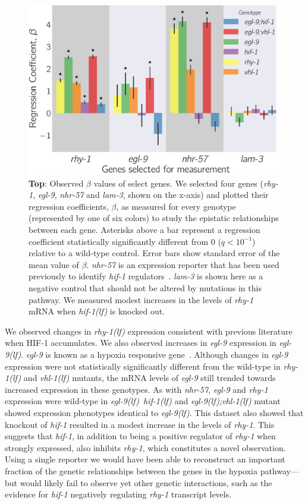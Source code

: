 \documentclass[10pt, onecolumn]{article}
\newcommand{\qval}[1]{$q<10^{-#1}$}
\newcommand{\gene}[1]{\emph{#1}}
\newcommand{\nhr}{\emph{\mbox{nhr-57}}}
\newcommand{\lam}{\emph{\mbox{lam-3}}}
\newcommand{\egl}{\emph{\mbox{egl-9}(lf)}}
\newcommand{\rhy}{\emph{\mbox{rhy-1}(lf)}}
\newcommand{\vhl}{\emph{\mbox{vhl-1}(lf)}}
\newcommand{\eglvhl}{\emph{\mbox{egl-9(lf);vhl-1(lf)}}}
\newcommand{\eglhif}{\emph{\mbox{egl-9(lf)}~\mbox{hif-1(lf)}}}
\newcommand{\hif}{\emph{\mbox{hif-1(lf)}}}
\newcommand{\hifp}{HIF-1}
\begin{document}
\begin{figure}[tbhp]
\centering
\includegraphics[width=.5\linewidth]{../figs/qpcr.pdf}
\caption{
\textbf{Top}: Observed $\beta$ values of select genes. We selected
four genes (\gene{rhy-1}, \gene{egl-9}, \nhr{} and \lam{}, shown on the x-axis)
and plotted their regression coefficients, $\beta$, as measured for every
genotype (represented by one of six colors) to study the epistatic relationships
between each gene. Asterisks above a bar represent a regression coefficient
statistically significantly different from 0 (\qval{1}) relative to a wild-type
control. Error bars show standard error of the mean
value of $\beta$. \nhr{} is an expression reporter that has been used previously
to identify \gene{hif-1} regulators~\cite{Shen2006,Shao2009}. \lam{} is shown here
as a negative control that should not be altered by mutations in this pathway.
We measured modest increases in the levels of \gene{rhy-1} mRNA when \hif{} is
knocked out.
}
\label{fig:qpcr}
\end{figure}

We observed changes in \rhy{} expression consistent with previous
literature~\cite{Shen2006} when \hifp{} accumulates.
We also observed increases in \gene{egl-9} expression in \egl{}.
\gene{egl-9} is known as a hypoxia responsive gene~\cite{Powell-Coffman2010}.
Although changes in \gene{egl-9} expression were not statistically significantly
different from the wild-type in
\rhy{} and \vhl{} mutants, the mRNA levels of \gene{egl-9} still trended towards
increased expression in these genotypes.
As with \nhr{}, \gene{egl-9} and \gene{rhy-1} expression were wild-type in
\eglhif{} and \eglvhl{} mutant showed expression phenotypes identical to \egl{}.
This dataset also showed that knockout of \gene{hif-1} resulted in a modest
increase in the levels of \gene{rhy-1}. This suggests that \gene{hif-1}, in
addition to being a positive regulator of \gene{rhy-1} when strongly expressed,
also inhibits \gene{rhy-1}, which constitutes a novel observation.
Using a single reporter we would have been able to reconstruct an
important fraction of the genetic relationships between the genes in the hypoxia
pathway–--but would likely fail to observe yet other genetic interactions, such as
the evidence for \gene{hif-1} negatively regulating \gene{rhy-1} transcript levels.
\end{document}
